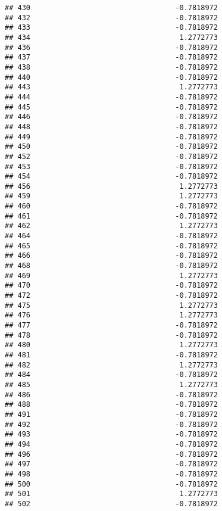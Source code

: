 \documentclass[
]{article}
\begin{document}
\begin{verbatim}
## 430                                  -0.7818972
## 432                                  -0.7818972
## 433                                  -0.7818972
## 434                                   1.2772773
## 436                                  -0.7818972
## 437                                  -0.7818972
## 438                                  -0.7818972
## 440                                  -0.7818972
## 443                                   1.2772773
## 444                                  -0.7818972
## 445                                  -0.7818972
## 446                                  -0.7818972
## 448                                  -0.7818972
## 449                                  -0.7818972
## 450                                  -0.7818972
## 452                                  -0.7818972
## 453                                  -0.7818972
## 454                                  -0.7818972
## 456                                   1.2772773
## 459                                   1.2772773
## 460                                  -0.7818972
## 461                                  -0.7818972
## 462                                   1.2772773
## 464                                  -0.7818972
## 465                                  -0.7818972
## 466                                  -0.7818972
## 468                                  -0.7818972
## 469                                   1.2772773
## 470                                  -0.7818972
## 472                                  -0.7818972
## 475                                   1.2772773
## 476                                   1.2772773
## 477                                  -0.7818972
## 478                                  -0.7818972
## 480                                   1.2772773
## 481                                  -0.7818972
## 482                                   1.2772773
## 484                                  -0.7818972
## 485                                   1.2772773
## 486                                  -0.7818972
## 488                                  -0.7818972
## 491                                  -0.7818972
## 492                                  -0.7818972
## 493                                  -0.7818972
## 494                                  -0.7818972
## 496                                  -0.7818972
## 497                                  -0.7818972
## 498                                  -0.7818972
## 500                                  -0.7818972
## 501                                   1.2772773
## 502                                  -0.7818972

\end{verbatim}
\end{document}

